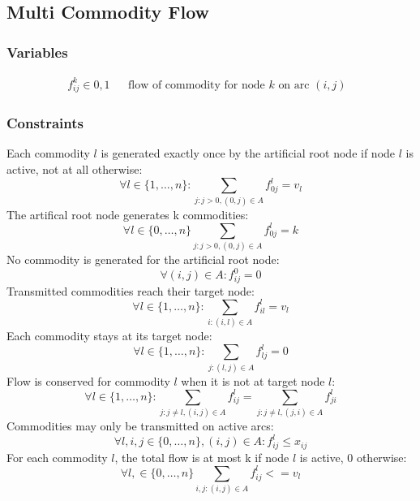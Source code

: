 \documentclass{article}
\begin{document}
\subsection{Multi Commodity Flow}
\subsubsection{Variables}
\begin{eqnarray}
f^k_{ij} \in {0, 1}  && \text{flow of commodity for node $k$ on arc $(i,j)$  } 
\end{eqnarray}

\subsubsection{Constraints}
Each commodity $l$ is generated exactly once by the artificial root node if node $l$ is active, not at all otherwise:
\begin{equation}
\forall l \in \{1,\ldots,n\}: \sum_{j:j>0,(0,j) \in A} f^l_{0j} = v_l
\end{equation}
The artifical root node generates k commodities:
\begin{equation}
\forall l \in \{0,\ldots,n\}\sum_{j:j>0,(0,j) \in A} f^l_{0j} = k
\end{equation}
No commodity is generated for the artificial root node:
\begin{equation}
\forall (i,j) \in A: f^0_{ij} = 0 
\end{equation}
Transmitted commodities reach their target node:
\begin{equation}
\forall l \in \{1,\ldots,n\}: \sum_{i:(i,l) \in A} f^l_{il} = v_l
\end{equation}
Each commodity stays at its target node:
\begin{equation}
\forall l \in \{1,\ldots,n\}: \sum_{j:(l,j) \in A} f^l_{lj} = 0
\end{equation}
Flow is conserved for commodity $l$ when it is not at target node $l$:
\begin{equation}
\forall l \in \{1,\ldots,n\}: \sum_{j:j \neq l, (i,j) \in A} f^l_{ij} = \sum_{j:j \neq l, (j,i) \in A} f^l_{ji}
\end{equation}
Commodities may only be transmitted on active arcs:
\begin{equation}
\forall l, i, j \in \{0,\ldots,n\}, (i,j) \in A: f^l_{ij} \leq x_{ij}
\end{equation}
For each commodity $l$, the total flow is at most k if node $l$ is active, 0 otherwise:
\begin{equation}
\forall l, \in \{0,\ldots,n\} \sum_{i,j:(i,j) \in A} f^l_{ij} <= v_l
\end{equation}
\end{document}

